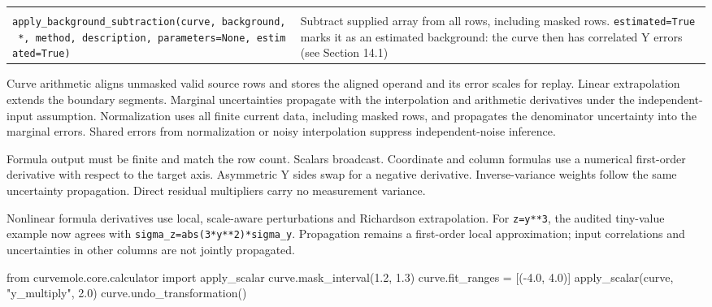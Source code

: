 \documentclass[
  10pt,
  a4paper,
  oneside]{scrreprt}
\newenvironment{Shaded}{}{}
\newcommand{\FloatTok}[1]{\textcolor[rgb]{0.25,0.63,0.44}{#1}}
\newcommand{\ImportTok}[1]{#1}
\newcommand{\NormalTok}[1]{#1}
\newcommand{\OperatorTok}[1]{\textcolor[rgb]{0.40,0.40,0.40}{#1}}
\newcommand{\StringTok}[1]{\textcolor[rgb]{0.25,0.44,0.63}{#1}}
\begin{document}
\begin{longtable}[]{@{}ll@{}}
\begin{minipage}[t]{0.47\columnwidth}
\end{minipage}\tabularnewline
\begin{minipage}[t]{0.47\columnwidth}\raggedright
\texttt{apply\_background\_subtraction(curve,\ background,\ *,\ method,\ description,\ parameters=None,\ estimated=True)}\strut
\end{minipage} & \begin{minipage}[t]{0.47\columnwidth}\raggedright
Subtract supplied array from all rows, including masked rows.
\texttt{estimated=True} marks it as an estimated background: the curve
then has correlated Y errors (see Section 14.1)\strut
\end{minipage}\tabularnewline
\bottomrule
\end{longtable}

Curve arithmetic aligns unmasked valid source rows and stores the
aligned operand and its error scales for replay. Linear extrapolation
extends the boundary segments. Marginal uncertainties propagate with the
interpolation and arithmetic derivatives under the independent-input
assumption. Normalization uses all finite current data, including masked
rows, and propagates the denominator uncertainty into the marginal
errors. Shared errors from normalization or noisy interpolation suppress
independent-noise inference.

Formula output must be finite and match the row count. Scalars
broadcast. Coordinate and column formulas use a numerical first-order
derivative with respect to the target axis. Asymmetric Y sides swap for
a negative derivative. Inverse-variance weights follow the same
uncertainty propagation. Direct residual multipliers carry no
measurement variance.

Nonlinear formula derivatives use local, scale-aware perturbations and
Richardson extrapolation. For \texttt{z=y**3}, the audited tiny-value
example now agrees with \texttt{sigma\_z=abs(3*y**2)*sigma\_y}.
Propagation remains a first-order local approximation; input
correlations and uncertainties in other columns are not jointly
propagated.

\begin{Shaded}
\begin{Highlighting}[]
\ImportTok{from}\NormalTok{ curvemole.core.calculator }\ImportTok{import}\NormalTok{ apply\_scalar}
\NormalTok{curve.mask\_interval(}\FloatTok{1.2}\NormalTok{, }\FloatTok{1.3}\NormalTok{)}
\NormalTok{curve.fit\_ranges }\OperatorTok{=}\NormalTok{ [(}\OperatorTok{{-}}\FloatTok{4.0}\NormalTok{, }\FloatTok{4.0}\NormalTok{)]}
\NormalTok{apply\_scalar(curve, }\StringTok{"y\_multiply"}\NormalTok{, }\FloatTok{2.0}\NormalTok{)}
\NormalTok{curve.undo\_transformation()}
\end{Highlighting}
\end{Shaded}
\end{document}
